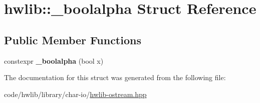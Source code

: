 \hypertarget{structhwlib_1_1__boolalpha}{}\section{hwlib\+:\+:\+\_\+boolalpha Struct Reference}
\label{structhwlib_1_1__boolalpha}
\subsection*{Public Member Functions}
\begin{DoxyCompactItemize}
\item 
\mbox{\label{structhwlib_1_1__boolalpha_a9972ce841479f54863b82332f82ed732}} 
constexpr {\bfseries \+\_\+boolalpha} (bool x)
\end{DoxyCompactItemize}


The documentation for this struct was generated from the following file\+:\begin{DoxyCompactItemize}
\item 
code/hwlib/library/char-\/io/\hyperlink{hwlib-ostream_8hpp}{hwlib-\/ostream.\+hpp}\end{DoxyCompactItemize}
